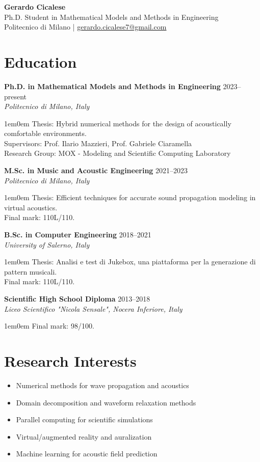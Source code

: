 \documentclass[11pt,a4paper]{article}
\newcommand{\cvitem}[3]{%
  \vspace{0.3em}%
  \noindent\textbf{#1} \hfill #2 \\
  \noindent\textit{#3}%
  \vspace{0.2em}%
}
\newcommand{\cvdetail}[1]{%
  \begin{adjustwidth}{1em}{0em}
    #1
  \end{adjustwidth}%
  \vspace{0.5em}%
}
\begin{document}
\begin{center}
  {\Huge\bfseries Gerardo Cicalese}\\[0.3em]
  {\large Ph.D. Student in Mathematical Models and Methods in Engineering}\\[0.2em]
  Politecnico di Milano \quad | \quad 
  \href{mailto:gerardo.cicalese7@gmail.com}{gerardo.cicalese7@gmail.com}
\end{center}

\vspace{0.5em}

\section{Education}

\cvitem{Ph.D. in Mathematical Models and Methods in Engineering}{2023--present}
{Politecnico di Milano, Italy}
\cvdetail{Thesis: Hybrid numerical methods for the design of acoustically comfortable environments.\\
Supervisors: Prof. Ilario Mazzieri, Prof. Gabriele Ciaramella\\
Research Group: MOX - Modeling and Scientific Computing Laboratory}

\cvitem{M.Sc. in Music and Acoustic Engineering}{2021--2023}
{Politecnico di Milano, Italy}
\cvdetail{Thesis: Efficient techniques for accurate sound propagation modeling in virtual acoustics.\\Final mark: 110L/110.}

\cvitem{B.Sc. in Computer Engineering}{2018--2021}
{University of Salerno, Italy}
\cvdetail{Thesis: Analisi e test di Jukebox, una piattaforma per la generazione di pattern musicali.\\Final mark: 110L/110.}

\cvitem{Scientific High School Diploma}{2013--2018}
{Liceo Scientifico "Nicola Sensale", Nocera Inferiore, Italy}
\cvdetail{Final mark: 98/100.}

\section{Research Interests}

\begin{itemize}
  \item Numerical methods for wave propagation and acoustics
  \item Domain decomposition and waveform relaxation methods
  \item Parallel computing for scientific simulations
  \item Virtual/augmented reality and auralization
  \item Machine learning for acoustic field prediction
\end{itemize}
\end{document}
